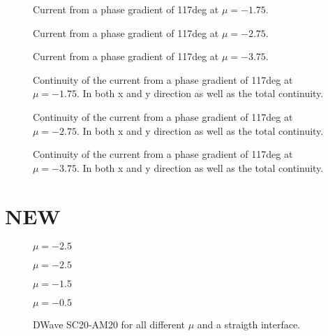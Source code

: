 \documentclass[../main.tex]{subfiles}
\begin{document}
\begin{figure}[H]
    
    \caption{Current from a phase gradient of 117deg at $\mu = -1.75$.}
\end{figure}
\begin{figure}[H]
    
    \caption{Current from a phase gradient of 117deg at $\mu = -2.75$.}
\end{figure}
\begin{figure}[H]
    
    \caption{Current from a phase gradient of 117deg at $\mu = -3.75$.}
\end{figure}
\begin{figure}[H]
    
    \caption{Continuity of the current from a phase gradient of 117deg at $\mu = -1.75$. In both x and y direction as
    well as the total continuity.}
\end{figure}
\begin{figure}[H]
    
    \caption{Continuity of the current from a phase gradient of 117deg at $\mu = -2.75$. In both x and y direction as
    well as the total continuity.}
\end{figure}
\begin{figure}[H]
    
    \caption{Continuity of the current from a phase gradient of 117deg at $\mu = -3.75$. In both x and y direction as
    well as the total continuity.}
\end{figure}

\section{NEW}
\begin{figure}[H]
    
    \caption{$\mu = -2.5$}
\end{figure}
\begin{figure}[H]
    
    \caption{$\mu = -2.5$}
\end{figure}
\begin{figure}[H]
    
    \caption{$\mu = -1.5$}
\end{figure}
\begin{figure}[H]
    
    \caption{$\mu = -0.5$}
\end{figure}
\begin{figure}[H]
    
    \caption{DWave SC20-AM20 for all different $\mu$ and a straigth interface.}
\end{figure}
\end{document}
